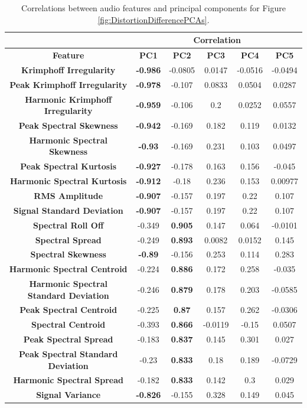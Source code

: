 		\begin{table}[h!]
			\centering
			\begin{tabular}{|c|c|c|c|c|c|}
				\cline{2-6}
				\multicolumn{1}{c|}{} & \multicolumn{5}{c|}{\bf{Correlation}} \tabularnewline
				\hline
				\bf{Feature} & \bf{PC1} & \bf{PC2} & \bf{PC3} & \bf{PC4} & \bf{PC5} \tabularnewline
				\hline
				\hline
				\bf{Krimphoff Irregularity} & \bf{-0.986} & -0.0805 & 0.0147 & -0.0516 & -0.0494 \tabularnewline
				\hline
				\bf{Peak Krimphoff Irregularity} & \bf{-0.978} & -0.107 & 0.0833 & 0.0504 & 0.0287 \tabularnewline
				\hline
				\bf{Harmonic Krimphoff Irregularity} & \bf{-0.959} & -0.106 & 0.2 & 0.0252 & 0.0557 \tabularnewline
				\hline
				\bf{Peak Spectral Skewness} & \bf{-0.942} & -0.169 & 0.182 & 0.119 & 0.0132 \tabularnewline
				\hline
				\bf{Harmonic Spectral Skewness} & \bf{-0.93} & -0.169 & 0.231 & 0.103 & 0.0497 \tabularnewline
				\hline
				\bf{Peak Spectral Kurtosis} & \bf{-0.927} & -0.178 & 0.163 & 0.156 & -0.045 \tabularnewline
				\hline
				\bf{Harmonic Spectral Kurtosis} & \bf{-0.912} & -0.18 & 0.236 & 0.153 & 0.00977 \tabularnewline
				\hline
				\bf{RMS Amplitude} & \bf{-0.907} & -0.157 & 0.197 & 0.22 & 0.107 \tabularnewline
				\hline
				\bf{Signal Standard Deviation} & \bf{-0.907} & -0.157 & 0.197 & 0.22 & 0.107 \tabularnewline
				\hline
				\bf{Spectral Roll Off} & -0.349 & \bf{0.905} & 0.147 & 0.064 & -0.0101 \tabularnewline
				\hline
				\bf{Spectral Spread} & -0.249 & \bf{0.893} & 0.0082 & 0.0152 & 0.145 \tabularnewline
				\hline
				\bf{Spectral Skewness} & \bf{-0.89} & -0.156 & 0.253 & 0.114 & 0.283 \tabularnewline
				\hline
				\bf{Harmonic Spectral Centroid} & -0.224 & \bf{0.886} & 0.172 & 0.258 & -0.035 \tabularnewline
				\hline
				\bf{Harmonic Spectral Standard Deviation} & -0.246 & \bf{0.879} & 0.178 & 0.203 & -0.0585 \tabularnewline
				\hline
				\bf{Peak Spectral Centroid} & -0.225 & \bf{0.87} & 0.157 & 0.262 & -0.0306 \tabularnewline
				\hline
				\bf{Spectral Centroid} & -0.393 & \bf{0.866} & -0.0119 & -0.15 & 0.0507 \tabularnewline
				\hline
				\bf{Peak Spectral Spread} & -0.183 & \bf{0.837} & 0.145 & 0.301 & 0.027 \tabularnewline
				\hline
				\bf{Peak Spectral Standard Deviation} & -0.23 & \bf{0.833} & 0.18 & 0.189 & -0.0729 \tabularnewline
				\hline
				\bf{Harmonic Spectral Spread} & -0.182 & \bf{0.833} & 0.142 & 0.3 & 0.029 \tabularnewline
				\hline
				\bf{Signal Variance} & \bf{-0.826} & -0.155 & 0.328 & 0.149 & 0.045 \tabularnewline
				\hline
			\end{tabular}
			\caption{Correlations between audio features and principal components for Figure
				 \ref{fig:DistortionDifferencePCAs}.}
			\label{fig:DistortionDifferenceCorrelations}
		\end{table}

